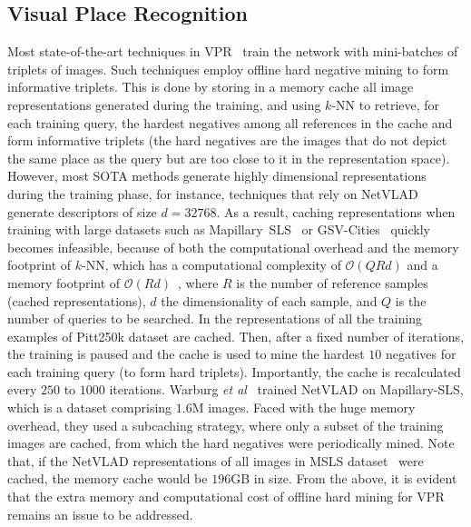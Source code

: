 \documentclass{bmvc2k}
\def\etal{\emph{et al}\bmvaOneDot}
\begin{document}
\subsection{Visual Place Recognition}\label{ssec:vpr}
Most state-of-the-art techniques in VPR~\cite{arandjelovic2016netvlad, liu2019stochastic, seymour2019semantically, warburg2020mapillary, kim2017learned, liu2020digging, hausler2021patch, wang2022transvpr} train the network with mini-batches of triplets of images. Such techniques employ offline hard negative mining to form informative triplets. This is done by storing in a memory cache all image representations generated during the training, and using $k$-NN to retrieve, for each training query, the hardest negatives among all references in the cache and form informative triplets (the hard negatives are the images that do not depict the same place as the query but are too close to it in the representation space). However, most SOTA methods generate highly dimensional representations during the training phase, for instance, techniques that rely on NetVLAD~\cite{arandjelovic2016netvlad} generate descriptors of size $d = 32768$. As a result, caching representations when training with large datasets such as Mapillary~SLS~\cite{warburg2020mapillary} or GSV-Cities~\cite{ali2022gsv} quickly becomes infeasible, because of both the computational overhead and the memory footprint of $k$-NN, which has a computational complexity of $\mathcal{O}(QRd)$ and a memory footprint of $\mathcal{O}(Rd)$~\cite{cunningham2021k}, where $R$ is the number of reference samples (cached representations), $d$ the dimensionality of each sample, and $Q$ is the number of queries to be searched.
In \cite{thoma2020soft, arandjelovic2016netvlad, liu2019stochastic} the representations of all the training examples of Pitt250k dataset are cached. Then, after a fixed number of iterations, the training is paused and the cache is used to mine the hardest $10$ negatives for each training query (to form hard triplets). Importantly, the cache is recalculated every $250$ to $1000$ iterations. Warburg \etal~\cite{warburg2020mapillary} trained NetVLAD on Mapillary-SLS, which is a dataset comprising $1.6$M images. Faced with the huge memory overhead, they used a subcaching strategy, where only a subset of the training images are cached, from which the hard negatives were periodically mined. Note that, if the NetVLAD representations of all images in MSLS dataset~\cite{warburg2020mapillary} were cached, the memory cache would be $196$GB in size.
From the above, it is evident that the extra memory and computational cost of offline hard mining for VPR remains an issue to be addressed. 
\end{document}
